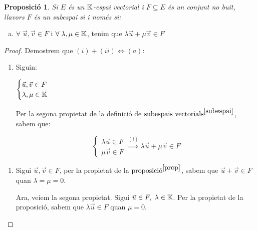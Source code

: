 \documentclass[a4paper, 11pt]{article}
\newtheorem*{prop}{Proposició}
\begin{document}
\begin{prop}\label{prop}
	Si $E$ és un $\mathbb{K}$-espai vectorial i $F \subseteq E$ és un conjunt no buit, llavors $F$ és un subespai si i només si:
\end{prop}
\begin{enumerate}[(a)]
	\item $\forall \; \vec{u}, \vec{v} \in F$  i  $\forall \; \lambda, \mu \in \mathbb{K}$, tenim que $\lambda\vec{u}+\mu\vec{v} \in F$
\end{enumerate}
\begin{proof}
	Demostrem que $(i)+(ii)\iff(a)$:
	\begin{enumerate}[$\Rightarrow$]
		\item Siguin:
		
		$\begin{cases}
			\vec{u}, \vec{v} \in F \\
			\lambda, \mu \in \mathbb{K}
		\end{cases}$
		
		Per la segona propietat de la definició de $\text{subespais vectorials}^{\ref{subespai}}$, sabem que:
		
		\begin{equation*}
			\begin{cases}
				\lambda\vec{u} \in F \\
				\mu\vec{v} \in F
			\end{cases}
			\overset{(i)}{\Longrightarrow}
			\lambda\vec{u}+\mu\vec{v} \in F
		\end{equation*}
	\end{enumerate}
	\begin{enumerate}[$\Leftarrow$]
		\item Sigui $\vec{u}, \vec{v} \in F$, per la propietat de la $\text{proposició}^{\ref{prop}}$, sabem que $\vec{u}+\vec{v}\in F$ quan $\lambda=\mu=0$.
		
		Ara, veiem la segona propietat. Sigui $\vec{u}\in F, \; \lambda\in\mathbb{K}$. Per la propietat de la proposició, sabem que $\lambda\vec{u} \in F$ quan $\mu=0$.
	\end{enumerate}
\end{proof}
\end{document}

